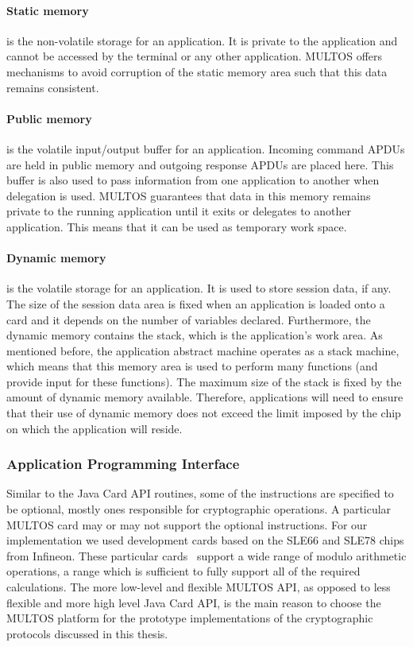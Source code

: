 \paragraph{Static memory} is the non-volatile storage for an application. It is
private to the application and cannot be accessed by the terminal or any other
application. MULTOS offers mechanisms to avoid corruption of the static memory
area such that this data remains consistent.

\paragraph{Public memory} is the volatile input/output buffer for an
application. Incoming command APDUs are held in public memory and outgoing
response APDUs are placed here. This buffer is also used to pass information
from one application to another when delegation is used. MULTOS guarantees that
data in this memory remains private to the running application until it exits
or delegates to another application. This means that it can be used as
temporary work space.

\paragraph{Dynamic memory} is the volatile storage for an application. It is
used to store session data, if any. The size of the session data area is fixed
when an application is loaded onto a card and it depends on the number of
variables declared. Furthermore, the dynamic memory contains the stack, which
is the application's work area. As mentioned before, the application abstract
machine operates as a stack machine, which means that this memory area is used
to perform many functions (and provide input for these functions). The maximum
size of the stack is fixed by the amount of dynamic memory available. Therefore,
applications will need to ensure that their use of dynamic memory does not
exceed the limit imposed by the chip~\cite{MIR2012} on which the application
will reside.

\subsubsection{Application Programming Interface}

Similar to the Java Card API routines, some of the
instructions are specified to be optional, mostly ones responsible for
cryptographic operations. A particular MULTOS card may or may not support the
optional instructions. For our implementation we used development cards based on
the SLE66 and SLE78 chips from Infineon. These particular
cards~\cite{MIR2012} support a wide range of modulo arithmetic
operations, a range which is sufficient to fully support all of the required
calculations. The more low-level and flexible MULTOS API, as
opposed to less flexible and more high level Java Card API, is the main reason
to choose the MULTOS platform for the prototype implementations of the
cryptographic protocols discussed in this thesis.

